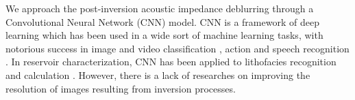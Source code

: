\documentclass[journal]{IEEEtran}
\begin{document}
% 

We approach the post-inversion acoustic impedance deblurring through
a Convolutional Neural Network (CNN) model. CNN is a framework of deep learning which has been
used in a wide sort of machine learning tasks, with notorious success in image and
video classification \cite{Krizhevsky2012, AbdelHamid2014}, action and speech recognition \cite{Farfade2015, S_Ji2013}.
In reservoir characterization, CNN has been applied to lithofacies recognition \cite{Qian} and calculation \cite{Liu2017}.
However, there is a lack of researches on improving the resolution of images resulting from inversion processes.
\end{document}
